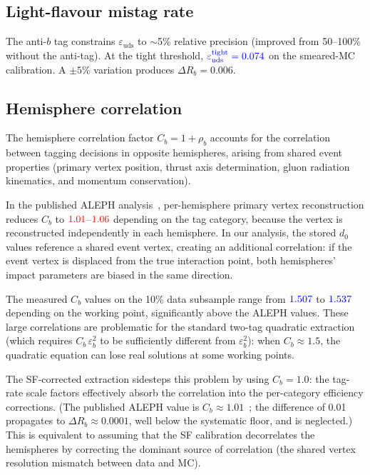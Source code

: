 \documentclass[11pt,a4paper]{article}
\newcommand{\measured}[1]{\textcolor{blue}{#1}}
\newcommand{\external}[1]{\textcolor{red}{#1}}
\begin{document}
\subsection{Light-flavour mistag rate}
\label{sec:syst-eps_uds}

The anti-$b$ tag constrains $\varepsilon_\text{uds}$ to
$\sim$5\% relative precision (improved from 50--100\% without
the anti-tag).
At the tight threshold,
$\measured{\varepsilon_\text{uds}^\text{tight} = 0.074}$ on
the smeared-MC calibration.
A $\pm 5\%$ variation produces $\Delta R_b = 0.006$.

\subsection{Hemisphere correlation}
\label{sec:syst-Cb}

The hemisphere correlation factor $C_b = 1 + \rho_b$ accounts for
the correlation between tagging decisions in opposite hemispheres,
arising from shared event properties (primary vertex position,
thrust axis determination, gluon radiation kinematics, and
momentum conservation).

In the published ALEPH analysis~\cite{ALEPH:Rb:1996}, per-hemisphere
primary vertex reconstruction reduces $C_b$ to
$\external{1.01}$--$\external{1.06}$ depending on the tag category,
because the vertex is reconstructed independently in each hemisphere.
In our analysis, the stored $d_0$ values reference a shared event
vertex, creating an additional correlation: if the event vertex is
displaced from the true interaction point, both hemispheres'
impact parameters are biased in the same direction.

The measured $C_b$ values on the 10\% data subsample range from
$\measured{1.507}$ to $\measured{1.537}$ depending on the
working point, significantly above the ALEPH values.
These large correlations are problematic for the standard
two-tag quadratic extraction (which requires
$C_b\,\varepsilon_b^2$ to be sufficiently different from
$\varepsilon_b^2$): when $C_b \approx 1.5$, the quadratic
equation can lose real solutions at some working points.

The SF-corrected extraction sidesteps this problem by using
$C_b = 1.0$: the tag-rate scale factors effectively absorb
the correlation into the per-category efficiency corrections.
(The published ALEPH value is $C_b \approx 1.01$~\cite{ALEPH:Rb:1996};
the difference of 0.01 propagates to $\Delta R_b \approx 0.0001$,
well below the systematic floor, and is neglected.)
This is equivalent to assuming that the SF calibration
decorrelates the hemispheres by correcting the dominant source
of correlation (the shared vertex resolution mismatch between
data and MC).
\end{document}
